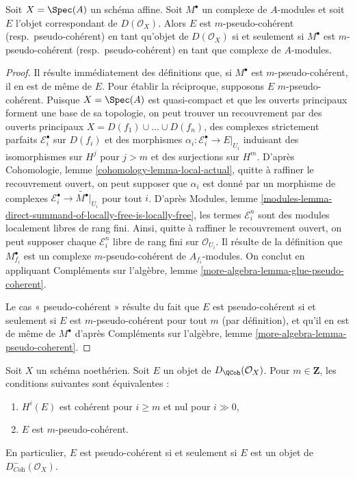 \begin{lemma}
\label{lemma-pseudo-coherent-affine}
Soit $X = \Spec(A)$ un schéma affine. Soit $M^\bullet$ un
complexe de $A$-modules et soit $E$ l'objet correspondant
de $D(\mathcal{O}_X)$. Alors $E$ est $m$-pseudo-cohérent
(resp.\ pseudo-cohérent) en tant qu'objet de $D(\mathcal{O}_X)$
si et seulement si $M^\bullet$ est $m$-pseudo-cohérent (resp.\ pseudo-cohérent)
en tant que complexe de $A$-modules.
\end{lemma}

\begin{proof}
Il résulte immédiatement des définitions que, si $M^\bullet$ est
$m$-pseudo-cohérent, il en est de même de $E$. Pour établir la réciproque, supposons
$E$ $m$-pseudo-cohérent. Puisque $X = \Spec(A)$ est quasi-compact et que
les ouverts principaux forment une base de sa topologie, on peut trouver un
recouvrement par des ouverts principaux $X = D(f_1) \cup \ldots \cup D(f_n)$, des complexes strictement
parfaits $\mathcal{E}_i^\bullet$ sur $D(f_i)$ et des
morphismes $\alpha_i : \mathcal{E}_i^\bullet \to E|_{U_i}$ induisant
des isomorphismes sur $H^j$ pour $j > m$ et des surjections sur $H^m$.
D'après Cohomologie, lemme \ref{cohomology-lemma-local-actual},
quitte à raffiner le recouvrement ouvert,
on peut supposer que $\alpha_i$ est donné par un morphisme de complexes
$\mathcal{E}_i^\bullet \to \widetilde{M^\bullet}|_{U_i}$
pour tout $i$. D'après Modules, lemme
\ref{modules-lemma-direct-summand-of-locally-free-is-locally-free},
les termes $\mathcal{E}_i^n$ sont des modules localement libres de rang fini.
Ainsi, quitte à raffiner le recouvrement ouvert, on peut supposer chaque
$\mathcal{E}_i^n$ libre de rang fini sur $\mathcal{O}_{U_i}$.
Il résulte de la définition que $M^\bullet_{f_i}$ est
un complexe $m$-pseudo-cohérent de $A_{f_i}$-modules.
On conclut en appliquant
Compléments sur l'algèbre, lemme \ref{more-algebra-lemma-glue-pseudo-coherent}.

\medskip\noindent
Le cas « pseudo-cohérent » résulte du fait que $E$ est
pseudo-cohérent si et seulement si $E$ est $m$-pseudo-cohérent pour
tout $m$ (par définition), et qu'il en est de même de $M^\bullet$
d'après Compléments sur l'algèbre, lemme \ref{more-algebra-lemma-pseudo-coherent}.
\end{proof}

\begin{lemma}
\label{lemma-identify-pseudo-coherent-noetherian}
Soit $X$ un schéma noethérien. Soit $E$ un objet de
$D_\QCoh(\mathcal{O}_X)$. Pour $m \in \mathbf{Z}$, les
conditions suivantes sont équivalentes :
\begin{enumerate}
\item $H^i(E)$ est cohérent pour $i \geq m$ et nul pour $i \gg 0$,
\item $E$ est $m$-pseudo-cohérent.
\end{enumerate}
En particulier, $E$ est pseudo-cohérent si et seulement si $E$ est un objet
de $D^-_{\textit{Coh}}(\mathcal{O}_X)$.
\end{lemma}

